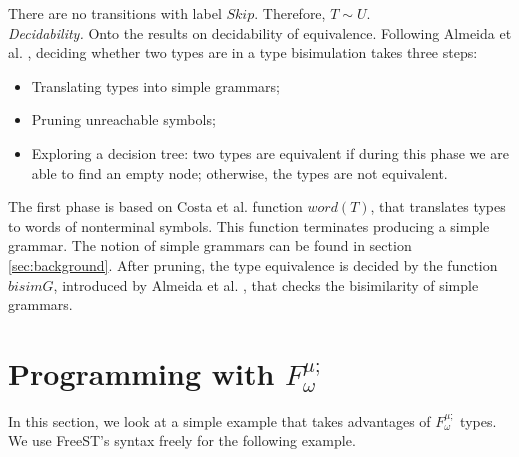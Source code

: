 \documentclass[sigplan]{acmart}
\begin{document}
\begin{enumerate}
\begin{center}
\end{center}
\end{enumerate} 

There are no transitions with label $Skip$. Therefore, $T\sim U$.\\

\textit{Decidability.   }
Onto the results on decidability of equivalence. 
Following Almeida et al. \cite{AlmeidaMV20}, deciding whether two types are in a type bisimulation takes three steps:

\begin{itemize}
    \item Translating types into simple grammars;
    \item Pruning unreachable symbols;
    \item Exploring a decision tree: two types are equivalent if during this phase we are able to find an empty node; otherwise,
    the types are not equivalent.
\end{itemize}

The first phase is based on Costa et al. \cite{PocasCMV23} function $word(T)$, that translates types to words of nonterminal symbols. This function terminates producing a simple grammar. The notion of simple grammars can be found in section \ref{sec:background}.
After pruning, the type equivalence is decided by the function $bisimG$, introduced by Almeida et al. \cite{AlmeidaMV20}, that checks the bisimilarity of simple grammars.

\section{Programming with $F^{\mu;}_\omega$} \label{sec:term-lang}
In this section, we look at a simple example that takes advantages of $F^{\mu;}_\omega$ types. We use FreeST's syntax freely for the following example.
\end{document}

